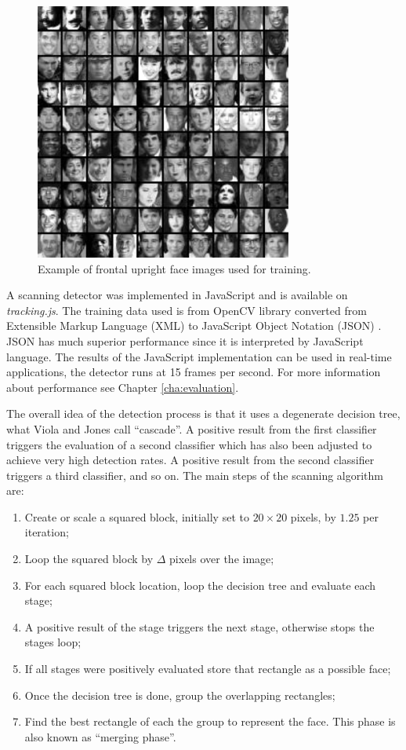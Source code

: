 \begin{figure}[!htb]
  \centering
  \includegraphics[width=240pt]{chapters/tracking_library_for_the_web/viola_training.png}
  \caption{Example of frontal upright face images used for training.}
  \label{figure:viola_training}
\end{figure}

A scanning detector was implemented in JavaScript and is available on \textit{tracking.js}. The training data used is from OpenCV library converted from Extensible Markup Language (XML) \cite{Bray2013} to JavaScript Object Notation (JSON) \cite{Crockford2013}. JSON has much superior performance since it is interpreted by JavaScript language. The results of the JavaScript implementation can be used in real-time applications, the detector runs at 15 frames per second. For more information about performance see Chapter \ref{cha:evaluation}.

The overall idea of the detection process is that it uses a degenerate decision tree, what Viola and Jones \cite{Viola2001} call ``cascade''. A positive result from the first classifier triggers the evaluation of a second classifier which has also been adjusted to achieve very high detection rates. A positive result from the second classifier triggers a third classifier, and so on. The main steps of the scanning algorithm are:

\begin{enumerate}
  \item Create or scale a squared block, initially set to $20\times20$ pixels, by $1.25$ per iteration;
  \item Loop the squared block by $\Delta$ pixels over the image;
  \item For each squared block location, loop the decision tree and evaluate each stage;
  \item A positive result of the stage triggers the next stage, otherwise stops the stages loop;
  \item If all stages were positively evaluated store that rectangle as a possible face;
  \item Once the decision tree is done, group the overlapping rectangles;
  \item Find the best rectangle of each the group to represent the face. This phase is also known as ``merging phase''.
\end{enumerate}

